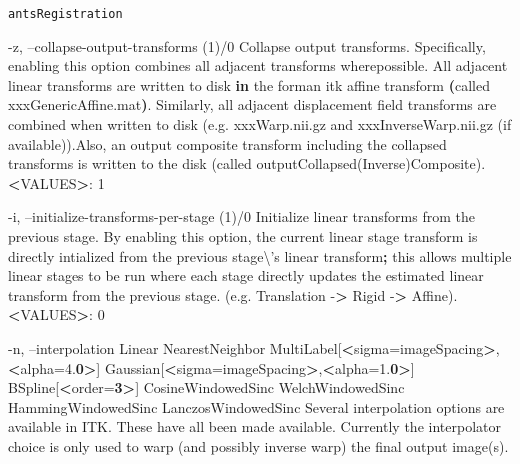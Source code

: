 \documentclass[ignorenonframetext,]{beamer}
\newenvironment{Shaded}{\begin{snugshade}}{\end{snugshade}}
\newcommand{\KeywordTok}[1]{\textcolor[rgb]{0.13,0.29,0.53}{\textbf{#1}}}
\newcommand{\DataTypeTok}[1]{\textcolor[rgb]{0.13,0.29,0.53}{#1}}
\newcommand{\OperatorTok}[1]{\textcolor[rgb]{0.81,0.36,0.00}{\textbf{#1}}}
\newcommand{\ExtensionTok}[1]{#1}
\newcommand{\NormalTok}[1]{#1}
\begin{document}
\begin{frame}[fragile]{\texttt{antsRegistration}}
\begin{Shaded}
\begin{Highlighting}[]
\NormalTok{     -z, --collapse-output-transforms (1)/0}
\NormalTok{          Collapse output transforms. Specifically, enabling this option combines all}
\NormalTok{          adjacent transforms wherepossible. All adjacent linear transforms are written to}
\NormalTok{          disk}\KeywordTok{ in}\NormalTok{ the forman itk affine transform }\KeywordTok{(}\NormalTok{called xxxGenericAffine.mat}\KeywordTok{)}\ExtensionTok{.}
          \ExtensionTok{Similarly}\NormalTok{, all adjacent displacement field transforms are combined when written}
          \ExtensionTok{to}\NormalTok{ disk (e.g. xxxWarp.nii.gz and xxxInverseWarp.nii.gz (if available))}\ExtensionTok{.Also}\NormalTok{, an}
          \ExtensionTok{output}\NormalTok{ composite transform including the collapsed transforms is written to the}
          \ExtensionTok{disk}\NormalTok{ (called outputCollapsed(Inverse)}\ExtensionTok{Composite}\NormalTok{)}\ExtensionTok{.}
          \OperatorTok{<}\ExtensionTok{VALUES}\OperatorTok{>}\NormalTok{: 1}

     \ExtensionTok{-i}\NormalTok{, --initialize-transforms-per-stage (1)}\ExtensionTok{/0}
          \ExtensionTok{Initialize}\NormalTok{ linear transforms from the previous stage. By enabling this option,}
          \ExtensionTok{the}\NormalTok{ current linear stage transform is directly intialized from the previous}
          \ExtensionTok{stage}\DataTypeTok{\textbackslash{}'}\NormalTok{s linear transform}\KeywordTok{;} \ExtensionTok{this}\NormalTok{ allows multiple linear stages to be run where}
          \ExtensionTok{each}\NormalTok{ stage directly updates the estimated linear transform from the previous}
          \ExtensionTok{stage.}\NormalTok{ (e.g. Translation -}\OperatorTok{>}\NormalTok{ Rigid -}\OperatorTok{>}\NormalTok{ Affine)}\ExtensionTok{.}
          \OperatorTok{<}\ExtensionTok{VALUES}\OperatorTok{>}\NormalTok{: 0}

     \ExtensionTok{-n}\NormalTok{, --interpolation Linear}
                         \ExtensionTok{NearestNeighbor}
                         \ExtensionTok{MultiLabel}\NormalTok{[}\OperatorTok{<}\NormalTok{sigma=imageSpacing}\OperatorTok{>}\NormalTok{,}\OperatorTok{<}\NormalTok{alpha=4.}\OperatorTok{0>}\NormalTok{]}
                         \ExtensionTok{Gaussian}\NormalTok{[}\OperatorTok{<}\NormalTok{sigma=imageSpacing}\OperatorTok{>}\NormalTok{,}\OperatorTok{<}\NormalTok{alpha=1.}\OperatorTok{0>}\NormalTok{]}
                         \ExtensionTok{BSpline}\NormalTok{[}\OperatorTok{<}\NormalTok{order=}\OperatorTok{3>}\NormalTok{]}
                         \ExtensionTok{CosineWindowedSinc}
                         \ExtensionTok{WelchWindowedSinc}
                         \ExtensionTok{HammingWindowedSinc}
                         \ExtensionTok{LanczosWindowedSinc}
          \ExtensionTok{Several}\NormalTok{ interpolation options are available in ITK. These have all been made}
          \ExtensionTok{available.}\NormalTok{ Currently the interpolator choice is only used to warp (and possibly}
          \ExtensionTok{inverse}\NormalTok{ warp) }\ExtensionTok{the}\NormalTok{ final output image(s)}\ExtensionTok{.}


\end{Highlighting}
\end{Shaded}
\end{frame}
\end{document}

